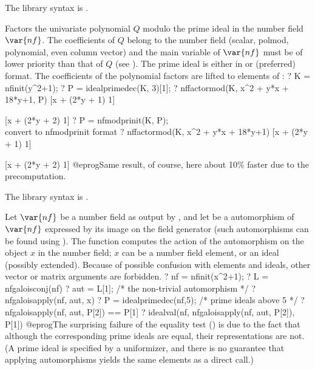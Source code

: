 The library syntax is .

\label{se:nffactormod}
Factors the univariate polynomial $Q$ modulo the prime ideal  in
the number field $\var{nf}$. The coefficients of $Q$ belong to the number
field (scalar, polmod, polynomial, even column vector) and the main variable
of $\var{nf}$ must be of lower priority than that of $Q$ (see
). The prime ideal  is either in
 or (preferred)  format. The coefficients
of the polynomial factors are lifted to elements of :
\bprog
? K = nfinit(y^2+1);
? P = idealprimedec(K, 3)[1];
? nffactormod(K, x^2 + y*x + 18*y+1, P)
[x + (2*y + 1) 1]

[x + (2*y + 2) 1]
? P = nfmodprinit(K, P);  \\ convert to nfmodprinit format
? nffactormod(K, x^2 + y*x + 18*y+1)
[x + (2*y + 1) 1]

[x + (2*y + 2) 1]
@eprog\noindent Same result, of course, here about 10\% faster due to the
precomputation.

The library syntax is .

\label{se:nfgaloisapply}
Let $\var{nf}$ be a
number field as output by , and let  be a 
automorphism of $\var{nf}$ expressed by its image on the field generator
(such automorphisms can be found using ). The function
computes the action of the automorphism  on the object $x$ in the
number field; $x$ can be a number field element, or an ideal (possibly
extended). Because of possible confusion with elements and ideals, other
vector or matrix arguments are forbidden.
 \bprog
 ? nf = nfinit(x^2+1);
 ? L = nfgaloisconj(nf)
 ? aut = L[1]; /* the non-trivial automorphism */
 ? nfgaloisapply(nf, aut, x)
 ? P = idealprimedec(nf,5); /* prime ideals above 5 */
 ? nfgaloisapply(nf, aut, P[2]) == P[1]
 ? idealval(nf, nfgaloisapply(nf, aut, P[2]), P[1])
@eprog\noindent The surprising failure of the equality test () is
due to the fact that although the corresponding prime ideals are equal, their
representations are not. (A prime ideal is specified by a uniformizer, and
there is no guarantee that applying automorphisms yields the same elements
as a direct  call.)

